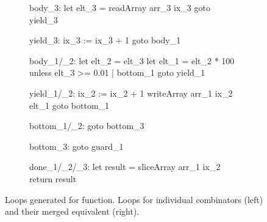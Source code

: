 \documentclass[preamble.tex]{subfiles}
\begin{document}
\begin{figure}
\begin{subfigure}{.55\textwidth}
\begin{loopcode}[%
    literate=
        {_1}{{\sub{map}}}3  %
        {_2}{{\sub{filt}}}2 %
        {_3}{{\sub{mfst}}}3 %
]
body_3:
  let elt_3 = readArray arr_3 ix_3
  goto yield_3

yield_3:
  ix_3 := ix_3 + 1
  goto body_1



body_1/_2:
  let elt_2 = elt_3
  let elt_1 = elt_2 * 100
  unless elt_3 >= 0.01 | bottom_1
  goto yield_1

yield_1/_2:
  ix_2 := ix_2 + 1
  writeArray arr_1 ix_2 elt_1
  goto bottom_1

bottom_1/_2:
  goto bottom_3



bottom_3:
  goto guard_1

done_1/_2/_3:
  let result = sliceArray arr_1 ix_2
  return result
\end{loopcode}
\end{subfigure}
\caption{Loops generated for  function. Loops for individual combinators (left) and their merged equivalent (right).}
\label{fig:toPercentages-loops}
\end{figure}
\end{document}
